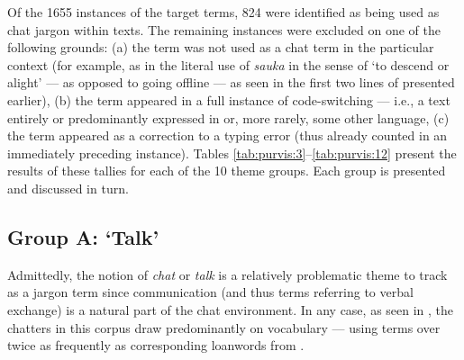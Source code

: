 \documentclass[output=paper,newtxmath,modfonts,nonflat,hidelinks]{langsci/langscibook}
\begin{document}
Of the 1655 instances of the target terms, 824 were identified as being used as chat jargon within  texts. The remaining instances were excluded on one of the following grounds: (a) the term was not used as a chat term in the particular context (for example, as in the literal use of \textit{sauka} in the sense of ‘to descend or alight’ — as opposed to going offline — as seen in the first two lines of  presented earlier), (b) the term appeared in a full instance of code-switching — i.e., a text entirely or predominantly expressed in  or, more rarely, some other language, (c) the term appeared as a correction to a typing error (thus already counted in an immediately preceding instance). Tables \ref{tab:purvis:3}--\ref{tab:purvis:12} present the results of these tallies for each of the 10 theme groups. Each group is presented and discussed in turn.

\subsection{Group A: ‘Talk’}

Admittedly, the notion of \textit{chat} or \textit{talk} is a relatively problematic theme to track as a jargon term since communication (and thus terms referring to verbal exchange) is a natural part of the chat environment. In any case, as seen in , the  chatters in this corpus draw predominantly on  vocabulary — using  terms over twice as frequently as corresponding loanwords from .
\end{document}
